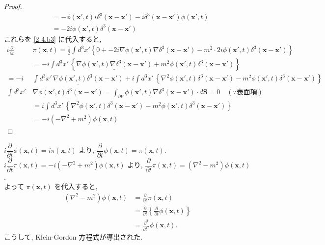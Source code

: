 \documentclass[a4paper,12pt]{article}
\begin{document}
\begin{proof}
\begin{align*}
  &= -\phi(\mathbf{x}', t) i \delta^3(\mathbf{x} - \mathbf{x}') - i \delta^3(\mathbf{x} - \mathbf{x}') \phi(\mathbf{x}', t) \tag{2-4.b12}\\
  &= -2i \phi(\mathbf{x}', t) \delta^3(\mathbf{x} - \mathbf{x}') \tag{2-4.b13}
\end{align*}
これらを \eqref{2-4.b3} に代入すると,
\begin{align*}
  i\frac{\partial}{\partial t} &\pi(\mathbf{x}, t) = \frac{1}{2}\int d^3 x' \left\{ 0 + -2i \nabla \phi(\mathbf{x}', t) \nabla \delta^3(\mathbf{x} - \mathbf{x}') - m^2 \cdot 2i \phi(\mathbf{x}', t) \delta^3(\mathbf{x} - \mathbf{x}') \right\} \tag{2-4.b14}\\
  &= -i\int d^3 x'\, \left\{ \underline{ \nabla \phi(\mathbf{x}', t) \nabla \delta^3(\mathbf{x} - \mathbf{x}')} + m^2 \phi(\mathbf{x}', t) \delta^3(\mathbf{x} - \mathbf{x}') \right\} \tag{2-4.b15}\\
  = -i&\underline{\int d^3 x'\, \nabla \phi(\mathbf{x}', t) \delta^3(\mathbf{x} - \mathbf{x}')} + i\int d^3 x'\, \left\{ \nabla^2 \phi(\mathbf{x}', t) \delta^3(\mathbf{x} - \mathbf{x}') - m^2 \phi(\mathbf{x}', t) \delta^3(\mathbf{x} - \mathbf{x}') \right\} \tag{2-4.b16}\\
  \int d^3 x'\, &\nabla \phi(\mathbf{x}', t) \delta^3(\mathbf{x} - \mathbf{x}') = \int_{\partial V} \phi(\mathbf{x}', t) \nabla \delta^3(\mathbf{x} - \mathbf{x}') \cdot d\mathbf{S} = 0 \quad(\because \text{表面項}) \tag{2-4.b17}\\
  &= i\int d^3 x'\, \left\{ \nabla^2 \phi(\mathbf{x}', t) \delta^3(\mathbf{x} - \mathbf{x}') - m^2 \phi(\mathbf{x}', t) \delta^3(\mathbf{x} - \mathbf{x}') \right\} \tag{2-4.b18}\\
  &= -i(-\nabla^2 + m^2) \phi(\mathbf{x}, t) \tag{2-4.b19}
\end{align*}
\end{proof}
\noindent $i\dfrac{\partial}{\partial t} \phi(\mathbf{x}, t) = i \pi(\mathbf{x}, t)$ より, $\dfrac{\partial}{\partial t} \phi(\mathbf{x}, t) = \pi(\mathbf{x}, t)$.\\
$i\dfrac{\partial}{\partial t} \pi(\mathbf{x}, t) = -i(-\nabla^2 + m^2) \phi(\mathbf{x}, t)$ より, $\dfrac{\partial}{\partial t} \pi(\mathbf{x}, t) = (\nabla^2 - m^2) \phi(\mathbf{x}, t)$.\\
よって $\pi(\mathbf{x}, t)$ を代入すると,
\begin{align*}
  (\nabla^2 - m^2) \phi(\mathbf{x}, t) &= \frac{\partial}{\partial t} \pi(\mathbf{x}, t) \tag{2-4.b20}\\
  &= \frac{\partial}{\partial t} \left\{ \frac{\partial}{\partial t} \phi(\mathbf{x}, t) \right\} \tag{2-4.b21}\\
  &= \frac{\partial^2}{\partial t^2} \phi(\mathbf{x}, t). \tag{2-4.b22}
\end{align*}
こうして, Klein-Gordon 方程式が導出された.
\color{black}
\end{document}
